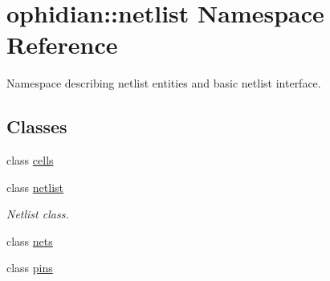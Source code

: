 \hypertarget{namespaceophidian_1_1netlist}{\section{ophidian\-:\-:netlist Namespace Reference}
\label{namespaceophidian_1_1netlist}
}


Namespace describing netlist entities and basic netlist interface.  


\subsection*{Classes}
\begin{DoxyCompactItemize}
\item 
class \hyperlink{classophidian_1_1netlist_1_1cells}{cells}
\item 
class \hyperlink{classophidian_1_1netlist_1_1netlist}{netlist}
\begin{DoxyCompactList}\small\item\em Netlist class. \end{DoxyCompactList}\item 
class \hyperlink{classophidian_1_1netlist_1_1nets}{nets}
\item 
class \hyperlink{classophidian_1_1netlist_1_1pins}{pins}
\end{DoxyCompactItemize}
